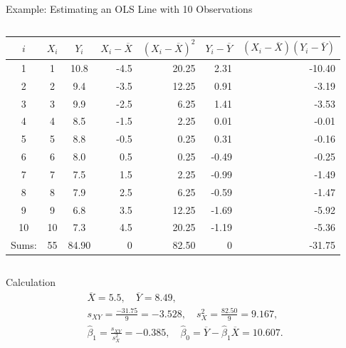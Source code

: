 \documentclass[notes,10pt, aspectratio=169]{beamer}
\begin{document}
\begin{frame}{Example: Estimating an OLS Line with 10 Observations}
\tiny
\begin{columns}[T]
\begin{column}{0.68\textwidth}
\begin{center}
\begin{tabular}{c|c|c|r|r|r|r}
$i$ & $X_i$ & $Y_i$ & $X_i-\overline X$ & $(X_i-\overline X)^2$ & $Y_i-\overline Y$ & $(X_i-\overline X)(Y_i-\overline Y)$ \\ \hline
1 & 1 & 10.8 & -4.5 & 20.25 &  2.31 & -10.40 \\
2 & 2 &  9.4 & -3.5 & 12.25 &  0.91 &  -3.19 \\
3 & 3 &  9.9 & -2.5 &  6.25 &  1.41 &  -3.53 \\
4 & 4 &  8.5 & -1.5 &  2.25 &  0.01 &  -0.01 \\
5 & 5 &  8.8 & -0.5 &  0.25 &  0.31 &  -0.16 \\
6 & 6 &  8.0 &  0.5  &  0.25 & -0.49 &  -0.25 \\
7 & 7 &  7.5 &  1.5  &  2.25 & -0.99 &  -1.49 \\
8 & 8 &  7.9 &  2.5  &  6.25 & -0.59 &  -1.47 \\
9 & 9 &  6.8 &  3.5  & 12.25 & -1.69 &  -5.92 \\
10 & 10 & 7.3 & 4.5  & 20.25 & -1.19 &  -5.36 \\ \hline
\multicolumn{1}{r|}{Sums:} & 55 & 84.90 & 0 & 82.50 & 0 & -31.75
\end{tabular}
\end{center}
\end{column}
\begin{column}{0.30\textwidth}
\begin{center}
\end{center}
\end{column}
\end{columns}
\vspace{-.15cm}
\begin{block}{Calculation}
\scriptsize
\[
\begin{gathered}
\overline{X}=5.5,\quad \overline{Y}=8.49,\\[-2pt]
s_{XY}=\frac{-31.75}{9}=-3.528,\quad
s_X^2=\frac{82.50}{9}=9.167,\\[-2pt]
\hat{\beta}_1=\frac{s_{XY}}{s_X^2}=-0.385,\quad
\hat{\beta}_0=\overline{Y}-\hat{\beta}_1\overline{X}=10.607.
\end{gathered}
\]
\end{block}
\end{frame}
\end{document}
